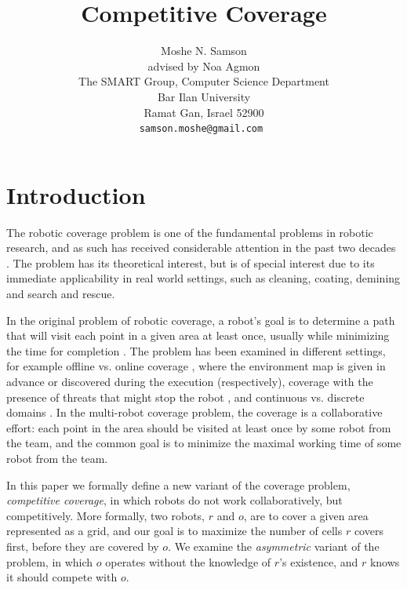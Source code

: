 \documentclass[a4paper,10pt]{article}
\newcommand\rob{\ensuremath{r}\xspace}
\newcommand\opp{\ensuremath{o}\xspace}
\begin{document}
\title{Competitive Coverage}
\author{Moshe N. Samson\\
advised by Noa Agmon\\
The SMART Group, Computer Science Department\\
Bar Ilan University\\
Ramat Gan, Israel 52900\\
\tt\small samson.moshe@gmail.com
}



\tableofcontents
\maketitle

\section{Introduction}
The robotic coverage problem is one of the fundamental problems in robotic research, and as such has received considerable attention in the past two decades \cite{galceran2013survey}. The problem has its theoretical interest, but is of special interest due to its immediate applicability in real world settings, such as cleaning, coating, demining and search and rescue. 

In the original problem of robotic coverage, a robot's goal is to determine a path that will visit each point in a given area at least once, usually while minimizing the time for completion \cite{galceran2013survey}. The problem has been examined in different settings, for example offline vs. online coverage \cite{gabriely2001spanning,agmon2008giving}, where the environment map is given in advance or discovered during the execution (respectively), coverage with the presence of threats that might stop the robot \cite{yehoshua2014safest}, and continuous vs. discrete domains \cite{gabriely2001spanning,yang2004neural}. In the multi-robot coverage problem, the coverage is a collaborative effort: each point in the area should be visited at least once by some robot from the team, and the common goal is to minimize the maximal working time of some robot from the team. 

In this paper we formally define a new variant of the coverage problem, {\em competitive coverage}, in which robots do not work collaboratively, but competitively. More formally, two robots, \rob and \opp, are to cover a given area represented as a grid, and our goal is to maximize the number of cells \rob covers first, before they are covered by \opp. We examine the {\em asymmetric} variant of the problem, in which \opp operates without the knowledge of \rob's existence, and \rob knows it should compete with \opp. 
\end{document}
